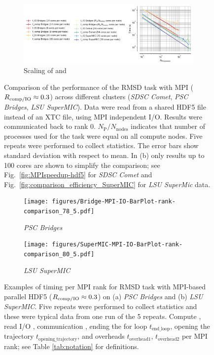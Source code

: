 \begin{figure}[!htb]
  \begin{subfigure} {\textwidth}
    \includegraphics[width=\linewidth]{figures/Clusters_IO_compute_scaling.pdf}
    \captionsetup{format=hang}
    \caption{Scaling of \tcomp and \tIO}
    \label{fig:compute-IO-scaling-clusters}
  \end{subfigure}
  \caption{Comparison of the performance of the RMSD task with MPI ($R_{\text{comp/IO}} \approx 0.3$)  across different clusters (\emph{SDSC Comet}, \emph{PSC Bridges}, \emph{LSU SuperMIC}).
    Data were read from a shared HDF5 file instead of an XTC file, using MPI independent I/O.
    Results were communicated back to rank 0.
    $N_{\text{P}}/N_{\text{nodes}}$ indicates that number of processes used for the task were equal on all compute nodes.
    Five repeats were performed to collect statistics.
    The error bars show standard deviation with respect to mean.
    In (b) only results up to 100 cores are shown to simplify the comparison; see Fig.~\protect\ref{fig:MPIspeedup-hdf5} for \emph{SDSC Comet} and Fig.~\protect\ref{fig:comparison_efficiency_SuperMIC} for \emph{LSU SuperMic} data.
  }
\label{fig:MPIwithIO-clusters}
\end{figure} 

\begin{figure}[!htb]
  \centering
  \begin{subfigure}{.49\textwidth}
    \texttt{[image: figures/Bridge-MPI-IO-BarPlot-rank-comparison\_78\_5.pdf]}
    \caption{\emph{PSC Bridges}}
    \label{fig:hdf5-bridge}
  \end{subfigure}
  \bigskip
  \begin{subfigure} {.49\textwidth}
    \texttt{[image: figures/SuperMIC-MPI-IO-BarPlot-rank-comparison\_80\_5.pdf]}
    \caption{\emph{LSU SuperMIC}}
    \label{fig:hdf5-SuperMIC}
  \end{subfigure}
  \caption{Examples of timing per MPI rank for RMSD task with MPI-based parallel HDF5 ($R_{\text{comp/IO}} \approx 0.3$) on (a) \emph{PSC Bridges} and (b) \emph{LSU SuperMIC}.
    Five repeats were performed to collect statistics and these were typical data from one run of the 5 repeats. Compute \tcomp, read I/O \tIO, communication \tcomm, ending the for loop $t_{\text{end\_loop}}$,  opening the trajectory $t_{\text{opening\_trajectory}}$, and overheads $t_{\text{overhead1}}$, $t_{\text{overhead2}}$ per MPI rank; see Table \ref{tab:notation} for definitions.}
  \label{fig:MPIwithIO-clusters-rank}
\end{figure} 

